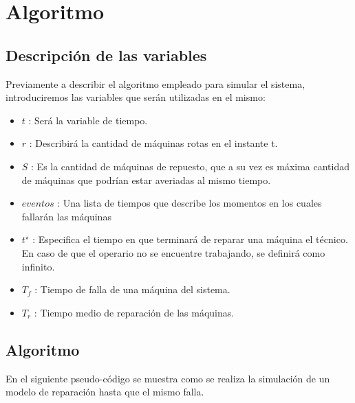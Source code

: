 \documentclass[10pt,a4paper]{article} %
\begin{document}
    \newpage
    \section{Algoritmo}
    \subsection{Descripci\'on de las variables}
    Previamente a describir el algoritmo empleado para simular el sistema, introduciremos las variables que ser\'an utilizadas en el mismo:
    \begin{itemize}
    \item $t$ : Ser\'a la variable de tiempo.
    \item $r$ : Describir\'a la cantidad de m\'aquinas rotas en el instante t.
    \item $S$ : Es la cantidad de m\'aquinas de repuesto, que a su vez es m\'axima cantidad de m\'aquinas que podr\'ian estar averiadas al mismo tiempo.
    \item $eventos$ : Una lista de tiempos que describe los momentos en los cuales fallar\'an las m\'aquinas
    \item $t^{\star}$ : Especifica el tiempo en que terminar\'a de reparar una m\'aquina el t\'ecnico. En caso de que el operario no se encuentre trabajando, se definir\'a como infinito.
    \item $T_f$ : Tiempo de falla de una m\'aquina del sistema.
    \item $T_r$ : Tiempo medio de reparaci\'on de las m\'aquinas.
    \end{itemize}

    \subsection{Algoritmo}
    En el siguiente pseudo-c\'odigo se muestra como se realiza la simulaci\'on de un modelo de reparaci\'on hasta que el mismo falla.
    
\end{document}
